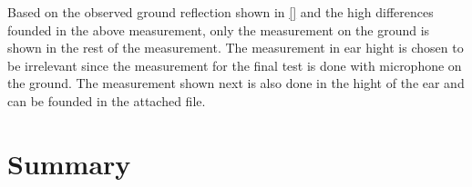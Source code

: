 Based on the observed ground reflection shown in \autoref{} and the high differences founded in the above measurement, only the measurement on the ground is shown in the rest of the measurement. The measurement in ear hight is chosen to be irrelevant since the measurement for the final test is done with microphone on the ground. The measurement shown next is also done in the hight of the ear and can be founded in the attached file.














\section*{Summary}
